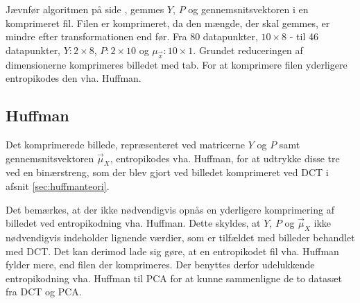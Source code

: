 Jævnfør algoritmen på side \pageref{tb:Algoritme-Komprimering-PCA}, gemmes $Y$, $P$ og gennemsnitsvektoren i en komprimeret fil. Filen er komprimeret, da den mængde, der skal gemmes, er mindre efter transformationen end før. Fra 80 datapunkter, $10 \times 8$ - til 46 datapunkter, $Y: 2 \times 8$, $P: 2 \times 10$ og $\mu_{\vec{x}}: 10 \times 1$. Grundet reduceringen af dimensionerne komprimeres billedet med tab. For at komprimere filen yderligere entropikodes den vha. Huffman.

\subsection*{Huffman}
Det komprimerede billede, repræsenteret ved matricerne $Y$ og $P$ samt gennemsnitsvektoren $\vec{\mu}_X$, entropikodes vha. Huffman, for at udtrykke disse tre ved en binærstreng, som der blev gjort ved billedet komprimeret ved DCT i afsnit \vref{sec:huffmanteori}.

Det bemærkes, at der ikke nødvendigvis opnås en yderligere komprimering af billedet ved entropikodning vha. Huffman. Dette skyldes, at $Y$, $P$ og $\vec{\mu}_X$ ikke nødvendigvis indeholder lignende værdier, som er tilfældet med billeder behandlet med DCT. Det kan derimod lade sig gøre, at en entropikodet fil vha. Huffman fylder mere, end filen der komprimeres. Der benyttes derfor udelukkende entropikodning vha. Huffman til PCA for at kunne sammenligne de to datasæt fra DCT og PCA.

